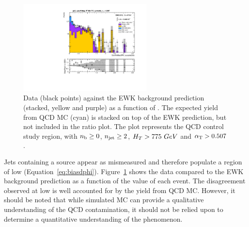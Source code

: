 \begin{figure}[t]
  \centering
  \includegraphics[width=0.6\textwidth]
  {Figs/datapred/qcd_study_region/ge2j_ge0b_775_upwards/Prediction_ComMinBiasDPhi_acceptedJets_all_775_upwards_QCD}
  \caption{Data (black points) against the EWK background prediction 
  (stacked, yellow and purple) as a function of \mindphistar. The expected yield
  from QCD MC (cyan) is stacked on top of the EWK prediction, but not included
  in the ratio plot. The plot represents
  the QCD control study region, with $n_{\text{b}} \geq 0$, $n_{\text{jet}} \geq 2$, $H_T > 775
 ~GeV$ and $\alpha_{\text{T}} > 0.507$.}
  \label{fig:qcd_region_pred_dphistar_incl}
\end{figure}

Jets containing a \met source appear as mismeasured and therefore
populate a region of low \dphistar (Equation~\ref{eq:biasdphi}).
Figure~\ref{fig:qcd_region_pred_dphistar_incl} shows the data compared to the
EWK background prediction
as a function of the \mindphistar value of each event. The disagreement observed
at low \mindphistar is well accounted for by the yield from QCD MC. However, it
should be noted that while simulated MC can provide a qualitative understanding
of the QCD
contamination, it should not be relied upon to determine a quantitative
understanding of the phenomenon.

